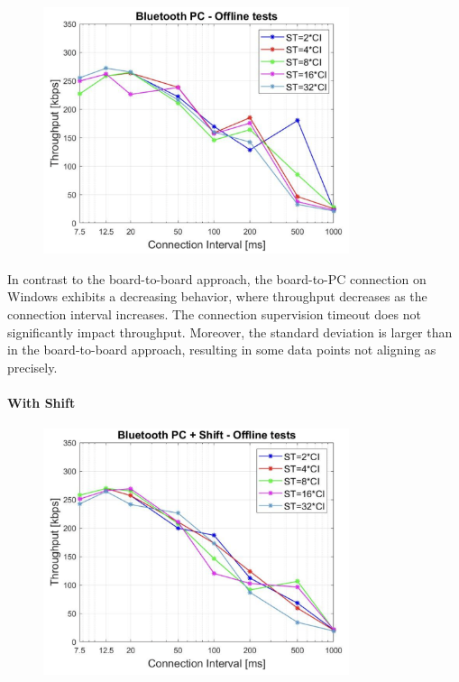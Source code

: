\documentclass{Configuration_Files/PoliMi3i_thesis}
\begin{document}
\begin{figure}[h!]
    \centering
    \includegraphics[width=0.8\textwidth]{Results Manuel/figure33}
    \label{fig:figure1}
\end{figure}

In contrast to the board-to-board approach, the board-to-PC connection on Windows exhibits a decreasing behavior, where throughput decreases as the connection interval increases. The connection supervision timeout does not significantly impact throughput. Moreover, the standard deviation is larger than in the board-to-board approach, resulting in some data points not aligning as precisely.

\paragraph{With Shift}

\begin{figure}[h!]
    \centering
    \includegraphics[width=0.8\textwidth]{Results Manuel/figure34}
    \label{fig:figure1}
\end{figure}
\end{document}

